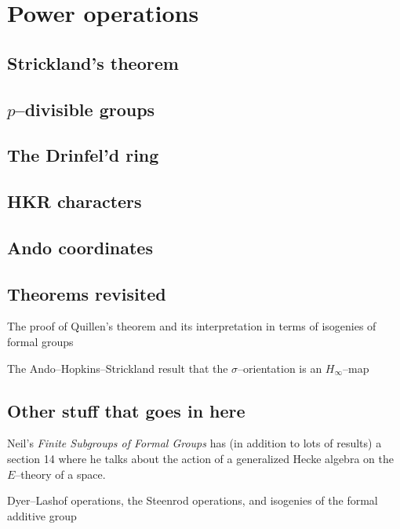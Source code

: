 
\chapter{Power operations}

\section{Strickland's theorem}

\section{$p$--divisible groups}

\section{The Drinfel'd ring}

\section{HKR characters}

\section{Ando coordinates}

\section{Theorems revisited}

The proof of Quillen's theorem and its interpretation in terms of isogenies of formal groups

The Ando--Hopkins--Strickland result that the $\sigma$--orientation is an $H_\infty$--map

\section*{Other stuff that goes in here}

Neil's \textit{Finite Subgroups of Formal Groups} has (in addition to lots of results) a section 14 where he talks about the action of a generalized Hecke algebra on the $E$--theory of a space.

Dyer--Lashof operations, the Steenrod operations, and isogenies of the formal additive group 

